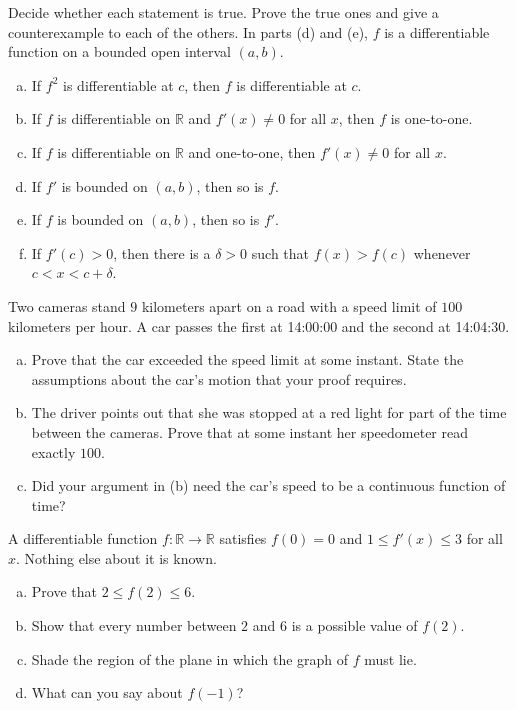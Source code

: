 \begin{problem}
Decide whether each statement is true.  Prove the true ones and give a counterexample to each of the others.  In parts (d) and (e), $f$ is a differentiable function on a bounded open interval $(a,b)$.
\begin{enumerate}[(a)]
	\item If $f^2$ is differentiable at $c$, then $f$ is differentiable at $c$.
	\item If $f$ is differentiable on $\mathbb{R}$ and $f'(x) \neq 0$ for all $x$, then $f$ is one-to-one.
	\item If $f$ is differentiable on $\mathbb{R}$ and one-to-one, then $f'(x) \neq 0$ for all $x$.
	\item If $f'$ is bounded on $(a,b)$, then so is $f$.
	\item If $f$ is bounded on $(a,b)$, then so is $f'$.
	\item If $f'(c) > 0$, then there is a $\delta > 0$ such that $f(x) > f(c)$ whenever $c < x < c + \delta$.
\end{enumerate}
\end{problem}

\begin{problem}
Two cameras stand $9$ kilometers apart on a road with a speed limit of $100$ kilometers per hour.  A car passes the first at 14:00:00 and the second at 14:04:30.
\begin{enumerate}[(a)]
	\item Prove that the car exceeded the speed limit at some instant.  State the assumptions about the car's motion that your proof requires.
	\item The driver points out that she was stopped at a red light for part of the time between the cameras.  Prove that at some instant her speedometer read exactly $100$.
	\item Did your argument in (b) need the car's speed to be a continuous function of time?
\end{enumerate}
\end{problem}

\begin{problem}
A differentiable function $f : \mathbb{R} \to \mathbb{R}$ satisfies $f(0) = 0$ and $1 \leq f'(x) \leq 3$ for all $x$.  Nothing else about it is known.
\begin{enumerate}[(a)]
	\item Prove that $2 \leq f(2) \leq 6$.
	\item Show that every number between $2$ and $6$ is a possible value of $f(2)$.
	\item Shade the region of the plane in which the graph of $f$ must lie.
	\item What can you say about $f(-1)$?
\end{enumerate}
\end{problem}

